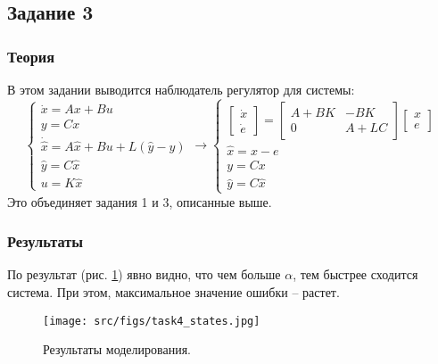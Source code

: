 \subsection{Задание 3}

\subsubsection{Теория}
В этом задании выводится наблюдатель регулятор для системы:
\[
        \begin{cases}
                \dot{x} = A x + B u\\
                y = C x \\
                \dot{\hat{x}} = A \hat{x} + B u + L(\hat{y} - y) \\
                \hat{y} = C \hat{x} \\
                u = K \hat{x}
        \end{cases} \rightarrow
        \begin{cases}
            \begin{bmatrix} 
                \dot{x} \\
                \dot{e}
            \end{bmatrix} = 
            \begin{bmatrix} 
                A + BK & -BK\\
                0 & A + LC
            \end{bmatrix}
            \begin{bmatrix} 
              x \\
              e
          \end{bmatrix} 
            \\
            \hat{x} = x - e \\
            y = Cx \\
            \hat{y} = C \hat{x}
         \end{cases}
\]
Это объединяет задания 1 и 3, описанные выше.

\subsubsection{Результаты}
По результат (рис. \ref{fig:task4}) явно видно, что чем больше \(\alpha\), тем быстрее сходится система. При этом, максимальное значение ошибки -- растет.

\begin{figure}[ht!]
    \centering
    \texttt{[image: src/figs/task4\_states.jpg]}
    \caption{Результаты моделирования.}
    \label{fig:task4}
\end{figure}




\FloatBarrier

